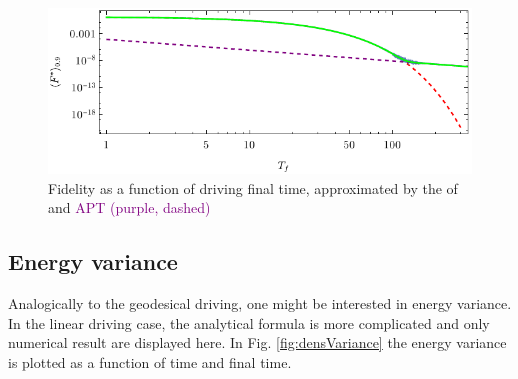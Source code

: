 \begin{figure}[h]
    \centering 
    \includegraphics[scale=1.2]{../img/landauCompare.pdf}
    \caption{Fidelity as a function of driving final time, approximated by the  of  and \textcolor{purple}{APT (purple, dashed)}}
    \label{fig:landauCompare}
\end{figure}


\subsection{Energy variance}
Analogically to the geodesical driving, one might be interested in energy variance. In the linear driving case, the analytical formula is more complicated and only numerical result are displayed here. In Fig. \ref{fig:densVariance} the energy variance is plotted as a function of time and final time.

